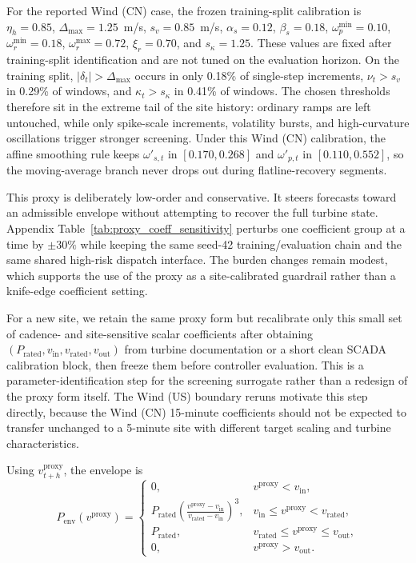 \documentclass[review,1p,times]{elsarticle}
\begin{document}
For the reported Wind (CN) case, the frozen training-split calibration is $\eta_h=0.85$, $\Delta_{\max}=1.25$~m/s, $s_v=0.85$~m/s, $\alpha_s=0.12$, $\beta_s=0.18$, $\omega_p^{\min}=0.10$, $\omega_r^{\min}=0.18$, $\omega_r^{\max}=0.72$, $\xi_r=0.70$, and $s_\kappa=1.25$. These values are fixed after training-split identification and are not tuned on the evaluation horizon. On the training split, $|\delta_t|>\Delta_{\max}$ occurs in only 0.18\% of single-step increments, $\nu_t>s_v$ in 0.29\% of windows, and $\kappa_t>s_\kappa$ in 0.41\% of windows. The chosen thresholds therefore sit in the extreme tail of the site history: ordinary ramps are left untouched, while only spike-scale increments, volatility bursts, and high-curvature oscillations trigger stronger screening. Under this Wind (CN) calibration, the affine smoothing rule keeps $\omega'_{s,t}$ in $[0.170,0.268]$ and $\omega'_{p,t}$ in $[0.110,0.552]$, so the moving-average branch never drops out during flatline-recovery segments.

This proxy is deliberately low-order and conservative. It steers forecasts toward an admissible envelope without attempting to recover the full turbine state. Appendix Table~\ref{tab:proxy_coeff_sensitivity} perturbs one coefficient group at a time by $\pm 30\%$ while keeping the same seed-42 training/evaluation chain and the same shared high-risk dispatch interface. The burden changes remain modest, which supports the use of the proxy as a site-calibrated guardrail rather than a knife-edge coefficient setting.

For a new site, we retain the same proxy form but recalibrate only this small set of cadence- and site-sensitive scalar coefficients after obtaining $(P_{\mathrm{rated}},v_{\mathrm{in}},v_{\mathrm{rated}},v_{\mathrm{out}})$ from turbine documentation or a short clean SCADA calibration block, then freeze them before controller evaluation. This is a parameter-identification step for the screening surrogate rather than a redesign of the proxy form itself. The Wind (US) boundary reruns motivate this step directly, because the Wind (CN) 15-minute coefficients should not be expected to transfer unchanged to a 5-minute site with different target scaling and turbine characteristics.

Using $v_{t+h}^{\mathrm{proxy}}$, the envelope is
\begin{equation}
P_{\mathrm{env}}(v^{\mathrm{proxy}})=
\begin{cases}
0, & v^{\mathrm{proxy}}<v_{\mathrm{in}},\\[2pt]
P_{\mathrm{rated}}\left(\frac{v^{\mathrm{proxy}}-v_{\mathrm{in}}}{v_{\mathrm{rated}}-v_{\mathrm{in}}}\right)^3, & v_{\mathrm{in}}\le v^{\mathrm{proxy}}<v_{\mathrm{rated}},\\[6pt]
P_{\mathrm{rated}}, & v_{\mathrm{rated}}\le v^{\mathrm{proxy}}\le v_{\mathrm{out}},\\[2pt]
0, & v^{\mathrm{proxy}}>v_{\mathrm{out}}.
\end{cases}
\label{eq:fg_env}
\end{equation}
\end{document}
